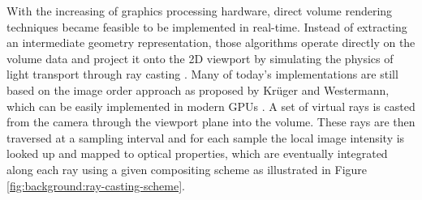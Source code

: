 With the increasing  of graphics processing hardware, direct volume rendering techniques became feasible to be implemented in real-time.
Instead of extracting an intermediate geometry representation, those algorithms operate directly on the volume data and project it onto the 2D viewport by simulating the physics of light transport through ray casting \cite{Engel:2006:VolumeGraphics}.
Many of today's implementations are still based on the image order approach as proposed by Krüger and Westermann, which can be easily implemented in modern GPUs \cite{Kruger:2003:RayCasting}.
A set of virtual rays is casted from the camera through the viewport plane into the volume.
These rays are then traversed at a  sampling interval and for each sample the local image intensity is looked up and mapped to optical properties, which are eventually integrated along each ray using a given compositing scheme as illustrated in Figure \ref{fig:background:ray-casting-scheme}.

